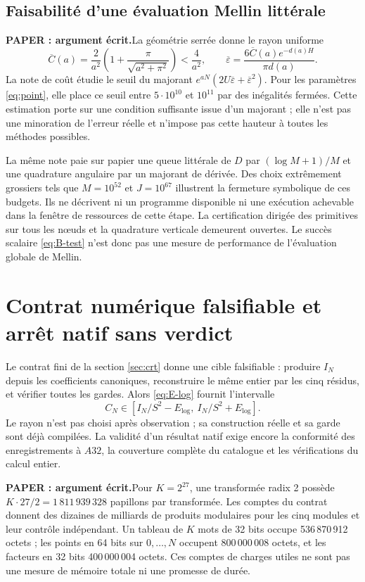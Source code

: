 \documentclass[11pt,a4paper]{article}
\theoremstyle{remark}
\newcommand{\paper}{\textbf{PAPER : argument écrit.}\space}
\begin{document}
\subsection*{Faisabilité d'une évaluation Mellin littérale}
\paper La géométrie serrée donne le rayon uniforme
\[
\overline C(a)=\frac2{a^2}\left(1+
\frac{\pi}{\sqrt{a^2+\pi^2}}\right)<\frac4{a^2},\qquad
\overline\varepsilon=
\frac{6\overline C(a)e^{-d(a)H}}{\pi d(a)}.
\]
La note de coût étudie le seuil du majorant
$e^{aN}(2U\overline\varepsilon+\overline\varepsilon^2)$.
Pour les paramètres \eqref{eq:point}, elle place ce seuil entre
$5\cdot10^{10}$ et $10^{11}$ par des inégalités fermées.
Cette estimation porte sur une condition suffisante issue d'un majorant ;
elle n'est pas une minoration de l'erreur réelle et n'impose pas cette
hauteur à toutes les méthodes possibles.

La même note paie sur papier une queue littérale de $D$ par
$(\log M+1)/M$ et une quadrature angulaire par un majorant de dérivée.
Des choix extrêmement grossiers tels que $M=10^{52}$ et $J=10^{67}$
illustrent la fermeture symbolique de ces budgets. Ils ne décrivent ni
un programme disponible ni une exécution achevable dans la fenêtre
de ressources de cette étape. La certification dirigée des primitives
sur tous les n\oe{}uds et la quadrature verticale demeurent ouvertes.
Le succès scalaire \eqref{eq:B-test} n'est donc pas une mesure de
performance de l'évaluation globale de Mellin.

\clearpage
\section{Contrat numérique falsifiable et arrêt natif sans verdict}\label{sec:numeric}
Le contrat fini de la section \ref{sec:crt} donne une cible falsifiable :
produire $I_N$ depuis les coefficients canoniques, reconstruire le même
entier par les cinq résidus, et vérifier toutes les gardes. Alors
\eqref{eq:E-log} fournit l'intervalle
\[
C_N\in\left[I_N/S^2-E_{\log},\ I_N/S^2+E_{\log}\right].
\]
Le rayon n'est pas choisi après observation ; sa construction réelle et
sa garde sont déjà compilées. La validité d'un résultat natif exige encore
la conformité des enregistrements à $A32$, la couverture complète du
catalogue et les vérifications du calcul entier.

\paper Pour $K=2^{27}$, une transformée radix 2 possède
$K\cdot27/2=1\,811\,939\,328$ papillons par transformée. Les comptes du
contrat donnent des dizaines de milliards de produits modulaires pour
les cinq modules et leur contrôle indépendant. Un tableau de $K$ mots
de 32 bits occupe 536\,870\,912 octets ; les points en 64 bits sur
$0,\ldots,N$ occupent 800\,000\,008 octets, et les facteurs en 32 bits
400\,000\,004 octets. Ces comptes de charges utiles ne sont pas une
mesure de mémoire totale ni une promesse de durée.
\end{document}

